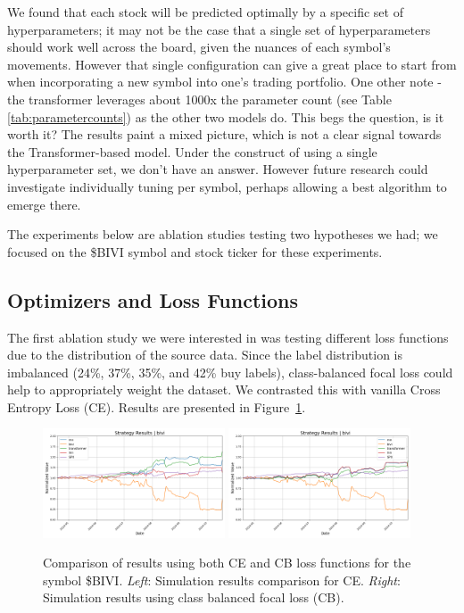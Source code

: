 \documentclass[10pt,twocolumn,letterpaper]{article}
\begin{document}
We found that each stock will be predicted optimally by a specific set of hyperparameters; it may not be the case that a single set of hyperparameters should work well across the board, given the nuances of each symbol’s movements. However that single configuration can give a great place to start from when incorporating a new symbol into one’s trading portfolio.
One other note - the transformer leverages about 1000x the parameter count (see Table \ref{tab:parametercounts}) as the other two models do. This begs the question, is it worth it? The results paint a mixed picture, which is not a clear signal towards the Transformer-based model. Under the construct of using a single hyperparameter set, we don’t have an answer. However future research could investigate individually tuning per symbol, perhaps allowing a best algorithm to emerge there.

The experiments below are ablation studies testing two hypotheses we had; we focused on the \$BIVI symbol and stock ticker for these experiments.

\subsection{Optimizers and Loss Functions}

The first ablation study we were interested in was testing different loss functions due to the distribution of the source data. Since the label distribution is imbalanced (24\%, 37\%, 35\%, and 42\% buy labels), class-balanced focal loss could help to appropriately weight the dataset\cite{cb_focal}. We contrasted this with vanilla Cross Entropy Loss (CE). Results are presented in Figure~\ref{fig:ceVsCbLoss}.

\begin{figure}[ht!]
    \centering
    \includegraphics[width=0.48\textwidth]{../figures/simulation_results_all_models_bivi_config_loss_ce.yml.png}
    \includegraphics[width=0.48\textwidth]{../figures/simulation_results_all_models_bivi_config_loss_cbfocal.yml.png} 
    \caption{Comparison of results using both CE and CB loss functions for the symbol \$BIVI. \emph{Left}: Simulation results comparison for CE. \emph{Right}: Simulation results using class balanced focal loss (CB).}
    \label{fig:ceVsCbLoss}
\end{figure}
\end{document}
